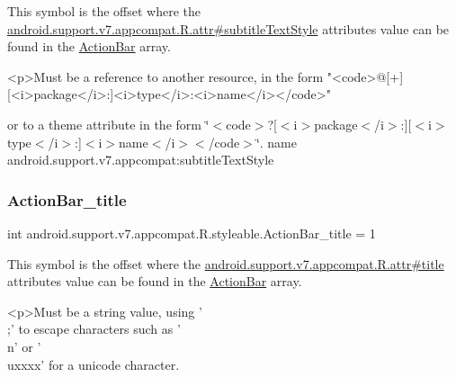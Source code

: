 This symbol is the offset where the \hyperlink{classandroid_1_1support_1_1v7_1_1appcompat_1_1R_1_1attr_a2a9a010f70cdd5dd8a5b63782382f5f7}{android.\+support.\+v7.\+appcompat.\+R.\+attr\#subtitle\+Text\+Style} attribute\textquotesingle{}s value can be found in the \hyperlink{classandroid_1_1support_1_1v7_1_1appcompat_1_1R_1_1styleable_a5941dc15714398e9ec9afaa0155cc1cf}{Action\+Bar} array.

\begin{DoxyVerb}      <p>Must be a reference to another resource, in the form "<code>@[+][<i>package</i>:]<i>type</i>:<i>name</i></code>"
\end{DoxyVerb}
 or to a theme attribute in the form \char`\"{}$<$code$>$?\mbox{[}$<$i$>$package$<$/i$>$\+:\mbox{]}\mbox{[}$<$i$>$type$<$/i$>$\+:\mbox{]}$<$i$>$name$<$/i$>$$<$/code$>$\char`\"{}.  name android.\+support.\+v7.\+appcompat\+:subtitle\+Text\+Style \mbox{\label{classandroid_1_1support_1_1v7_1_1appcompat_1_1R_1_1styleable_a67bcd46a24ee17f6a54d62d4b7d1b669}} 
\subsubsection{\texorpdfstring{Action\+Bar\+\_\+title}{ActionBar\_title}}
{\footnotesize\ttfamily int android.\+support.\+v7.\+appcompat.\+R.\+styleable.\+Action\+Bar\+\_\+title = 1\hspace{0.3cm}{\ttfamily [static]}}

This symbol is the offset where the \hyperlink{classandroid_1_1support_1_1v7_1_1appcompat_1_1R_1_1attr_a030356582065eaa1afdf1e3e37509b4c}{android.\+support.\+v7.\+appcompat.\+R.\+attr\#title} attribute\textquotesingle{}s value can be found in the \hyperlink{classandroid_1_1support_1_1v7_1_1appcompat_1_1R_1_1styleable_a5941dc15714398e9ec9afaa0155cc1cf}{Action\+Bar} array.

\begin{DoxyVerb}      <p>Must be a string value, using '\\;' to escape characters such as '\\n' or '\\uxxxx' for a unicode character.
\end{DoxyVerb}
 

